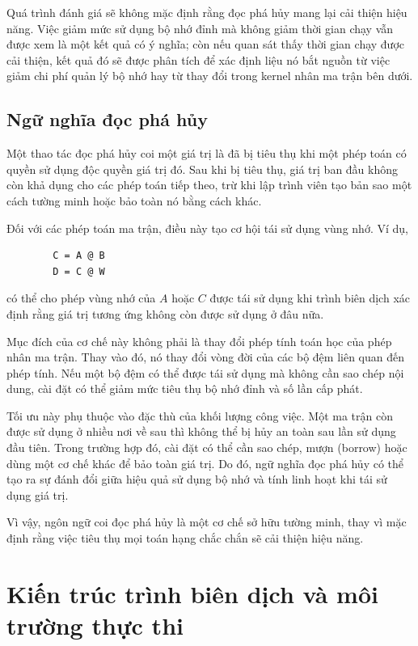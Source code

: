 \documentclass[a4paper]{article}
\begin{document}
	Quá trình đánh giá sẽ không mặc định rằng đọc phá hủy mang lại cải thiện hiệu năng. Việc giảm mức sử dụng bộ nhớ đỉnh mà không giảm thời gian chạy vẫn được xem là một kết quả có ý nghĩa; còn nếu quan sát thấy thời gian chạy được cải thiện, kết quả đó sẽ được phân tích để xác định liệu nó bắt nguồn từ việc giảm chi phí quản lý bộ nhớ hay từ thay đổi trong kernel nhân ma trận bên dưới.
	
	\subsection{Ngữ nghĩa đọc phá hủy}
	
	Một thao tác đọc phá hủy coi một giá trị là đã bị tiêu thụ khi một phép toán có quyền sử dụng độc quyền giá trị đó. Sau khi bị tiêu thụ, giá trị ban đầu không còn khả dụng cho các phép toán tiếp theo, trừ khi lập trình viên tạo bản sao một cách tường minh hoặc bảo toàn nó bằng cách khác.
	
	Đối với các phép toán ma trận, điều này tạo cơ hội tái sử dụng vùng nhớ. Ví dụ,
	
	\begin{lstlisting}
		C = A @ B
		D = C @ W
	\end{lstlisting}
	
	có thể cho phép vùng nhớ của $A$ hoặc $C$ được tái sử dụng khi trình biên dịch xác định rằng giá trị tương ứng không còn được sử dụng ở đâu nữa.
	
	Mục đích của cơ chế này không phải là thay đổi phép tính toán học của phép nhân ma trận. Thay vào đó, nó thay đổi vòng đời của các bộ đệm liên quan đến phép tính. Nếu một bộ đệm có thể được tái sử dụng mà không cần sao chép nội dung, cài đặt có thể giảm mức tiêu thụ bộ nhớ đỉnh và số lần cấp phát.
	
	Tối ưu này phụ thuộc vào đặc thù của khối lượng công việc. Một ma trận còn được sử dụng ở nhiều nơi về sau thì không thể bị hủy an toàn sau lần sử dụng đầu tiên. Trong trường hợp đó, cài đặt có thể cần sao chép, mượn (borrow) hoặc dùng một cơ chế khác để bảo toàn giá trị. Do đó, ngữ nghĩa đọc phá hủy có thể tạo ra sự đánh đổi giữa hiệu quả sử dụng bộ nhớ và tính linh hoạt khi tái sử dụng giá trị.
	
	Vì vậy, ngôn ngữ coi đọc phá hủy là một cơ chế sở hữu tường minh, thay vì mặc định rằng việc tiêu thụ mọi toán hạng chắc chắn sẽ cải thiện hiệu năng.
	
	\section{Kiến trúc trình biên dịch và môi trường thực thi}
	
\end{document}
